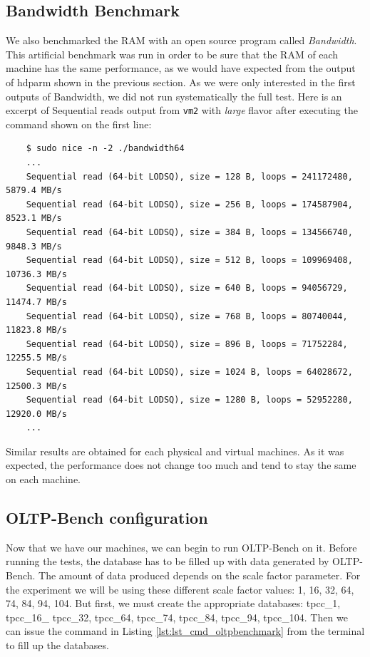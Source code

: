 \subsection{Bandwidth Benchmark}
We also benchmarked the RAM with an open source program called \textit{Bandwidth}. 
This artificial benchmark was run in order to be sure that the RAM of each machine has the same performance, as we would have expected from the output of hdparm shown in the previous section.
As we were only interested in the first outputs of Bandwidth, we did not run systematically the full test. Here is an excerpt of Sequential reads output from \texttt{vm2} with \textit{large} flavor after executing the command shown on the first line:

\begingroup
	\singlespacing
    \fontsize{10pt}{12pt}\selectfont
\begin{verbatim}
    $ sudo nice -n -2 ./bandwidth64
    ...
    Sequential read (64-bit LODSQ), size = 128 B, loops = 241172480, 5879.4 MB/s
    Sequential read (64-bit LODSQ), size = 256 B, loops = 174587904, 8523.1 MB/s
    Sequential read (64-bit LODSQ), size = 384 B, loops = 134566740, 9848.3 MB/s
    Sequential read (64-bit LODSQ), size = 512 B, loops = 109969408, 10736.3 MB/s
    Sequential read (64-bit LODSQ), size = 640 B, loops = 94056729, 11474.7 MB/s
    Sequential read (64-bit LODSQ), size = 768 B, loops = 80740044, 11823.8 MB/s
    Sequential read (64-bit LODSQ), size = 896 B, loops = 71752284, 12255.5 MB/s
    Sequential read (64-bit LODSQ), size = 1024 B, loops = 64028672, 12500.3 MB/s
    Sequential read (64-bit LODSQ), size = 1280 B, loops = 52952280, 12920.0 MB/s
    ...
\end{verbatim}
\endgroup

Similar results are obtained for each physical and virtual machines. 
As it was expected, the performance does not change too much and tend to stay the same on each machine.

\subsection{OLTP-Bench configuration}
Now that we have our machines, we can begin to run OLTP-Bench on it. 
Before running the tests, the database has to be filled up with data generated by OLTP-Bench. 
The amount of data produced depends on the scale factor parameter.
For the experiment we will be using these different scale factor values: 1, 16, 32, 64, 74, 84, 94, 104. 
But first, we must create the appropriate databases: tpcc\_1, tpcc\_16\_ tpcc\_32, tpcc\_64, tpcc\_74, tpcc\_84, tpcc\_94, tpcc\_104. 
Then we can issue the command in Listing \ref{lst:lst_cmd_oltpbenchmark} from the terminal to fill up the databases.

